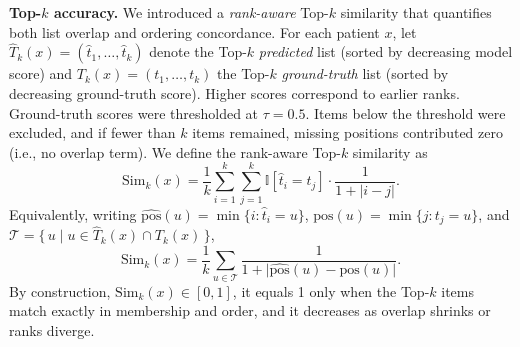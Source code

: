 \documentclass{article}
\begin{document}
\textbf{Top-$k$ accuracy.} We introduced a \emph{rank-aware} Top-$k$ similarity that quantifies both list overlap and ordering concordance. For each patient \(x\), let \(\hat T_k(x)=(\hat t_1,\ldots,\hat t_k)\) denote the Top-\(k\) \emph{predicted} list (sorted by decreasing model score) and \(T_k(x)=(t_1,\ldots,t_k)\) the Top-\(k\) \emph{ground-truth} list (sorted by decreasing ground-truth score). Higher scores correspond to earlier ranks. Ground-truth scores were thresholded at \(\tau=0.5\). Items below the threshold were excluded, and if fewer than \(k\) items remained, missing positions contributed zero (i.e., no overlap term). We define the rank-aware Top-$k$ similarity as
\begin{equation}
\mathrm{Sim}_k(x)
= \frac{1}{k}\sum_{i=1}^{k}\sum_{j=1}^{k}
\mathbb{I}\!\left[\hat t_i = t_j\right]\cdot \frac{1}{1+\lvert i-j\rvert}.
\label{eq:rankaware-topk}
\end{equation}
Equivalently, writing \(\widehat{\mathrm{pos}}(u)=\min\{i:\hat t_i=u\}\), \(\mathrm{pos}(u)=\min\{j:t_j=u\}\), and \(\mathcal T=\{\,u \mid u\in \hat T_k(x)\cap T_k(x)\,\}\),
\begin{equation}
\mathrm{Sim}_k(x)
= \frac{1}{k}\sum_{u\in \mathcal T}
\frac{1}{1+\big\lvert \widehat{\mathrm{pos}}(u)-\mathrm{pos}(u)\big\rvert}.
\label{eq:rankaware-topk-intersection}
\end{equation}
By construction, \(\mathrm{Sim}_k(x)\in[0,1]\), it equals 1 only when the Top-\(k\) items match exactly in membership and order, and it decreases as overlap shrinks or ranks diverge.
\end{document}
